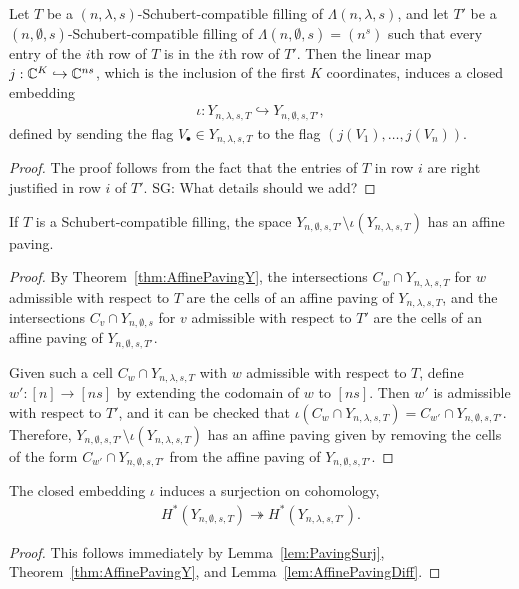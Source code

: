 \documentclass[12pt]{amsart}
\newcommand{\la}{\lambda}
\newcommand{\SG}[1]{{\color{red} SG: #1}}
\begin{document}
\begin{lemma}\label{lem:Embedding}
Let $T$ be a $(n,\la,s)$-Schubert-compatible filling of $\Lambda(n,\la,s)$, and let $T'$ be a $(n,\emptyset,s)$-Schubert-compatible filling of $\Lambda(n,\emptyset,s) = (n^s)$ such that every entry of the $i$th row of $T$ is in the $i$th row of $T'$. Then the linear map $j : \mathbb{C}^K \hookrightarrow \mathbb{C}^{ns}$, which is the inclusion of the first $K$ coordinates, induces a closed embedding 
\begin{align}
\iota : Y_{n,\la,s,T}\hookrightarrow Y_{n,\emptyset,s,T'},
\end{align}
defined by sending the flag $V_\bullet\in Y_{n,\la,s,T}$ to the flag $(j(V_1),\dots, j(V_n))$.
\end{lemma}

\begin{proof}
The proof follows from the fact that the entries of $T$ in row $i$ are right justified in row $i$ of $T'$. \SG{What details should we add?}
\end{proof}

\begin{lemma}\label{lem:AffinePavingDiff}
If $T$ is a Schubert-compatible filling, the space $Y_{n,\emptyset,s,T'}\setminus \iota(Y_{n,\la,s,T})$ has an affine paving.
\end{lemma}

\begin{proof}
By Theorem~\ref{thm:AffinePavingY}, the intersections $C_w\cap Y_{n,\la,s,T}$ for $w$ admissible with respect to $T$ are the cells of an affine paving of $Y_{n,\la,s,T}$, and the intersections $C_v\cap Y_{n,\emptyset,s}$ for $v$ admissible with respect to $T'$ are the cells of an affine paving of $Y_{n,\emptyset,s,T'}$.

Given such a cell $C_w\cap Y_{n,\la,s,T}$ with $w$ admissible with respect to $T$, define $w' : [n]\to [ns]$ by extending the codomain of $w$ to $[ns]$. Then $w'$ is admissible with respect to $T'$, and it can be checked that $\iota(C_w\cap Y_{n,\la,s,T}) = C_{w'}\cap Y_{n,\emptyset,s,T'}$. Therefore, $Y_{n,\emptyset,s,T'}\setminus \iota(Y_{n,\la,s,T})$ has an affine paving given by removing the cells of the form $C_{w'}\cap Y_{n,\emptyset,s,T'}$ from the affine paving of $Y_{n,\emptyset,s,T'}$.
\end{proof}





\begin{corollary}\label{cor:Surj}
The closed embedding $\iota$ induces a surjection on cohomology,
\begin{align}
H^*(Y_{n,\emptyset,s,T}) \twoheadrightarrow H^*(Y_{n,\la,s,T'}).
\end{align}
\end{corollary}
\begin{proof}
This follows immediately by Lemma~\ref{lem:PavingSurj}, Theorem~\ref{thm:AffinePavingY}, and Lemma~\ref{lem:AffinePavingDiff}.
\end{proof}
\end{document}
